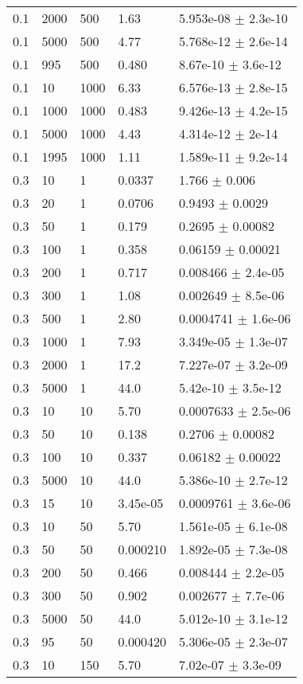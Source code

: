 \begin{longtable}{lllll}
	0.1 & 2000 & 500 & 1.63 & 5.953e-08 $\pm$ 2.3e-10 \\
	0.1 & 5000 & 500 & 4.77 & 5.768e-12 $\pm$ 2.6e-14 \\
	0.1 & 995 & 500 & 0.480 & 8.67e-10 $\pm$ 3.6e-12 \\
	0.1 & 10 & 1000 & 6.33 & 6.576e-13 $\pm$ 2.8e-15 \\
	0.1 & 1000 & 1000 & 0.483 & 9.426e-13 $\pm$ 4.2e-15 \\
	0.1 & 5000 & 1000 & 4.43 & 4.314e-12 $\pm$ 2e-14 \\
	0.1 & 1995 & 1000 & 1.11 & 1.589e-11 $\pm$ 9.2e-14 \\
	0.3 & 10 & 1 & 0.0337 & 1.766 $\pm$ 0.006 \\
	0.3 & 20 & 1 & 0.0706 & 0.9493 $\pm$ 0.0029 \\
	0.3 & 50 & 1 & 0.179 & 0.2695 $\pm$ 0.00082 \\
	0.3 & 100 & 1 & 0.358 & 0.06159 $\pm$ 0.00021 \\
	0.3 & 200 & 1 & 0.717 & 0.008466 $\pm$ 2.4e-05 \\
	0.3 & 300 & 1 & 1.08 & 0.002649 $\pm$ 8.5e-06 \\
	0.3 & 500 & 1 & 2.80 & 0.0004741 $\pm$ 1.6e-06 \\
	0.3 & 1000 & 1 & 7.93 & 3.349e-05 $\pm$ 1.3e-07 \\
	0.3 & 2000 & 1 & 17.2 & 7.227e-07 $\pm$ 3.2e-09 \\
	0.3 & 5000 & 1 & 44.0 & 5.42e-10 $\pm$ 3.5e-12 \\
	0.3 & 10 & 10 & 5.70 & 0.0007633 $\pm$ 2.5e-06 \\
	0.3 & 50 & 10 & 0.138 & 0.2706 $\pm$ 0.00082 \\
	0.3 & 100 & 10 & 0.337 & 0.06182 $\pm$ 0.00022 \\
	0.3 & 5000 & 10 & 44.0 & 5.386e-10 $\pm$ 2.7e-12 \\
	0.3 & 15 & 10 & 3.45e-05 & 0.0009761 $\pm$ 3.6e-06 \\
	0.3 & 10 & 50 & 5.70 & 1.561e-05 $\pm$ 6.1e-08 \\
	0.3 & 50 & 50 & 0.000210 & 1.892e-05 $\pm$ 7.3e-08 \\
	0.3 & 200 & 50 & 0.466 & 0.008444 $\pm$ 2.2e-05 \\
	0.3 & 300 & 50 & 0.902 & 0.002677 $\pm$ 7.7e-06 \\
	0.3 & 5000 & 50 & 44.0 & 5.012e-10 $\pm$ 3.1e-12 \\
	0.3 & 95 & 50 & 0.000420 & 5.306e-05 $\pm$ 2.3e-07 \\
	0.3 & 10 & 150 & 5.70 & 7.02e-07 $\pm$ 3.3e-09 \\

\end{longtable}
